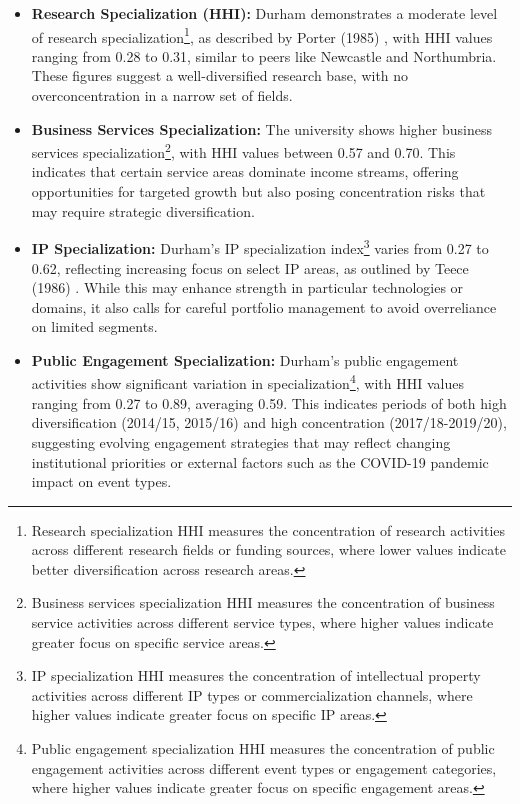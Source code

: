 \documentclass[journal,onecolumn, 10pt,draftclsnofoot]{IEEEtran}
\begin{document}
\begin{itemize}
    \item \textbf{Research Specialization (HHI):} Durham demonstrates a moderate level of research specialization\footnote{Research specialization HHI measures the concentration of research activities across different research fields or funding sources, where lower values indicate better diversification across research areas.}, as described by Porter (1985) \cite{porter1985competitive}, with HHI values ranging from 0.28 to 0.31, similar to peers like Newcastle and Northumbria. These figures suggest a well-diversified research base, with no overconcentration in a narrow set of fields.

\item \textbf{Business Services Specialization:} The university shows higher business services specialization\footnote{Business services specialization HHI measures the concentration of business service activities across different service types, where higher values indicate greater focus on specific service areas.}, with HHI values between 0.57 and 0.70. This indicates that certain service areas dominate income streams, offering opportunities for targeted growth but also posing concentration risks that may require strategic diversification.

\item \textbf{IP Specialization:} Durham's IP specialization index\footnote{IP specialization HHI measures the concentration of intellectual property activities across different IP types or commercialization channels, where higher values indicate greater focus on specific IP areas.} varies from 0.27 to 0.62, reflecting increasing focus on select IP areas, as outlined by Teece (1986) \cite{teece1986profiting}. While this may enhance strength in particular technologies or domains, it also calls for careful portfolio management to avoid overreliance on limited segments.

\item \textbf{Public Engagement Specialization:} Durham's public engagement activities show significant variation in specialization\footnote{Public engagement specialization HHI measures the concentration of public engagement activities across different event types or engagement categories, where higher values indicate greater focus on specific engagement areas.}, with HHI values ranging from 0.27 to 0.89, averaging 0.59. This indicates periods of both high diversification (2014/15, 2015/16) and high concentration (2017/18-2019/20), suggesting evolving engagement strategies that may reflect changing institutional priorities or external factors such as the COVID-19 pandemic impact on event types.
\end{itemize}
\end{document}
